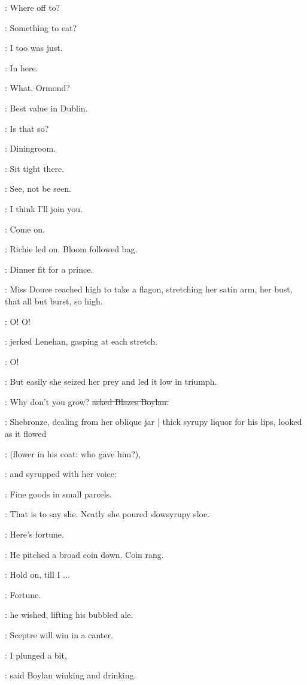 \goulding:
Where off to?

\BloomInt:
Something to eat?

\goulding:
I too was just.

\BloomInt:
In here.

\goulding:
What,
Ormond?

\BloomInt:
Best value in Dublin.

\goulding:
Is that so?

\BloomInt:
Diningroom.

\BloomInt:
Sit tight there.

\BloomInt:
See,
not be seen.

\goulding:
I think I'll join you.

\goulding:
Come on.

:
Richie led on.
Bloom followed bag.

\BloomInt:
Dinner fit for a prince.

:
Miss Douce reached high to take a flagon,
stretching her satin arm,
her bust,
that all but burst,
so high.

\lenehan:
O!
O!

:
jerked Lenehan,
gasping at each stretch.

\lenehan:
O!

:
But easily she seized her prey and led it low in triumph.

\boylan:
Why don't you grow?
\sout{asked Blazes Boylan.}

:
Shebronze,
dealing from her oblique jar |
thick syrupy liquor for his lips,
looked as it flowed

\BloomInt:
(flower in his coat:
who gave him?),

:
and syrupped with her voice:

\MissD:
Fine goods in small parcels.

:
That is to say she.
Neatly she poured slowsyrupy sloe.

\boylan:
Here's fortune.

:
He pitched a broad coin down.
Coin rang.

\lenehan:
Hold on,
till I ...

\lenehan:
Fortune.

:
he wished,
lifting his bubbled ale.

\lenehan:
Sceptre will win in a canter.

\boylan:
I plunged a bit,

:
said Boylan winking and drinking.

